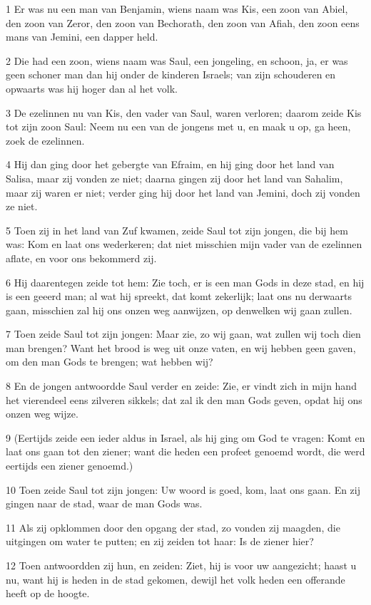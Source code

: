 \par 1 Er was nu een man van Benjamin, wiens naam was Kis, een zoon van Abiel, den zoon van Zeror, den zoon van Bechorath, den zoon van Afiah, den zoon eens mans van Jemini, een dapper held.
\par 2 Die had een zoon, wiens naam was Saul, een jongeling, en schoon, ja, er was geen schoner man dan hij onder de kinderen Israels; van zijn schouderen en opwaarts was hij hoger dan al het volk.
\par 3 De ezelinnen nu van Kis, den vader van Saul, waren verloren; daarom zeide Kis tot zijn zoon Saul: Neem nu een van de jongens met u, en maak u op, ga heen, zoek de ezelinnen.
\par 4 Hij dan ging door het gebergte van Efraim, en hij ging door het land van Salisa, maar zij vonden ze niet; daarna gingen zij door het land van Sahalim, maar zij waren er niet; verder ging hij door het land van Jemini, doch zij vonden ze niet.
\par 5 Toen zij in het land van Zuf kwamen, zeide Saul tot zijn jongen, die bij hem was: Kom en laat ons wederkeren; dat niet misschien mijn vader van de ezelinnen aflate, en voor ons bekommerd zij.
\par 6 Hij daarentegen zeide tot hem: Zie toch, er is een man Gods in deze stad, en hij is een geeerd man; al wat hij spreekt, dat komt zekerlijk; laat ons nu derwaarts gaan, misschien zal hij ons onzen weg aanwijzen, op denwelken wij gaan zullen.
\par 7 Toen zeide Saul tot zijn jongen: Maar zie, zo wij gaan, wat zullen wij toch dien man brengen? Want het brood is weg uit onze vaten, en wij hebben geen gaven, om den man Gods te brengen; wat hebben wij?
\par 8 En de jongen antwoordde Saul verder en zeide: Zie, er vindt zich in mijn hand het vierendeel eens zilveren sikkels; dat zal ik den man Gods geven, opdat hij ons onzen weg wijze.
\par 9 (Eertijds zeide een ieder aldus in Israel, als hij ging om God te vragen: Komt en laat ons gaan tot den ziener; want die heden een profeet genoemd wordt, die werd eertijds een ziener genoemd.)
\par 10 Toen zeide Saul tot zijn jongen: Uw woord is goed, kom, laat ons gaan. En zij gingen naar de stad, waar de man Gods was.
\par 11 Als zij opklommen door den opgang der stad, zo vonden zij maagden, die uitgingen om water te putten; en zij zeiden tot haar: Is de ziener hier?
\par 12 Toen antwoordden zij hun, en zeiden: Ziet, hij is voor uw aangezicht; haast u nu, want hij is heden in de stad gekomen, dewijl het volk heden een offerande heeft op de hoogte.

